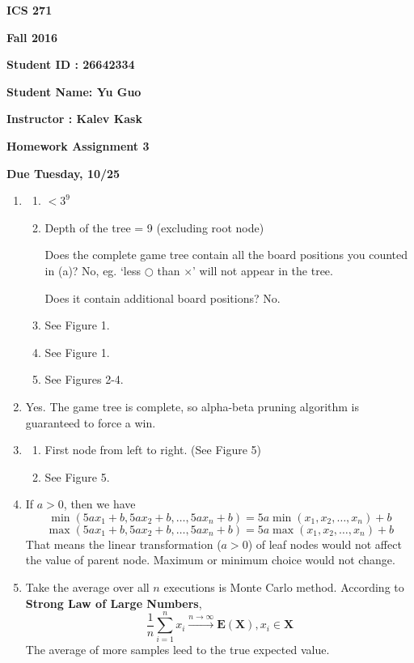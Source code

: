 \documentclass{article}
\begin{document}
{\bf ICS 271}

{\bf Fall 2016}

{\bf Student ID : 26642334}

{\bf Student Name: Yu Guo}

{\bf Instructor : Kalev Kask}

{\bf Homework Assignment 3}

{\bf Due Tuesday, 10/25}




\begin{enumerate}

\item

  \begin{enumerate}
    \item $<3^9$

    \item Depth of the tree = 9 (excluding root node)

    Does the complete game tree contain all the board positions you counted in (a)? No, eg. `less $\bigcirc$ than $\times$' will not appear in the tree. 

    Does it contain additional board positions? No.

    \item See Figure 1. 

    \item See Figure 1.

    \item See Figures 2-4.


  \end{enumerate}


\item

Yes. The game tree is complete, so alpha-beta pruning algorithm is guaranteed to force a win.

\item
  
  \begin{enumerate}
    \item First node from left to right. (See Figure 5)

    \item See Figure 5.
  \end{enumerate}


\item

If $a>0$, then we have
$$\min(5ax_1+b,5ax_2+b,\dots,5ax_n+b) = 5a\min(x_1,x_2,\dots,x_n)+b$$
$$\max(5ax_1+b,5ax_2+b,\dots,5ax_n+b) = 5a\max(x_1,x_2,\dots,x_n)+b$$
That means the linear transformation ($a>0$) of leaf nodes would not affect the value of parent node. Maximum or minimum choice would not change.

\item

Take the average over all $n$ executions is Monte Carlo method. According to \textbf{Strong Law of Large Numbers},
$$\frac{1}{n}\sum_{i=1}^n x_i \xrightarrow[]{n\rightarrow\infty} \mathbf{E}(\mathbf{X}), x_i\in\mathbf{X}$$
The average of more samples leed to the true expected value.

\end{enumerate}
\end{document}
